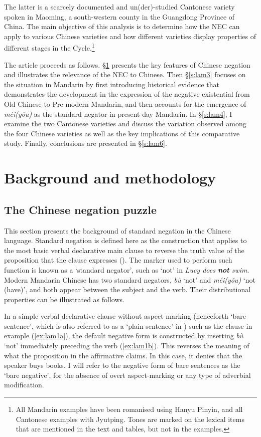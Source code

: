 \documentclass[output=paper]{langscibook}
\begin{document}
The latter is a scarcely documented and un(der)-studied Cantonese variety spoken in Maoming, a south-western county in the Guangdong Province of China. The main objective of this analysis is to determine how the NEC can apply to various Chinese varieties and how different varieties display properties of different stages in the Cycle.\footnote{All Mandarin examples have been romanised using Hanyu Pinyin, and all Cantonese examples with Jyutping. Tones are marked on the lexical items that are mentioned in the text and tables, but not in the examples.} 

The article proceeds as follows. §\ref{s:lam2} presents the key features of Chinese negation and illustrates the relevance of the NEC to Chinese. Then §\ref{s:lam3} focuses on the situation in Mandarin by first introducing historical evidence that demonstrates the development in the expression of the negative existential from Old Chinese to Pre-modern Mandarin, and then accounts for the emergence of \textit{méi(yǒu)} as the standard negator in present-day Mandarin. In §\ref{s:lam4}, I examine the two Cantonese varieties and discuss the variation observed among the four Chinese varieties as well as the key implications of this comparative study. Finally, conclusions are presented in §\ref{s:lam6}. 

\section{Background and methodology}\label{s:lam2}
\subsection{The Chinese negation puzzle}\label{s:lam2-1}

This section presents the background of standard negation in the Chinese language. Standard negation is defined here as the construction that applies to the most basic verbal declarative main clause to reverse the truth value of the proposition that the clause expresses (\citealt{Miestamo2005}). The marker used to perform such function is known as a `standard negator', such as `not' in \textit{Lucy does \textbf{not} swim}. Modern Mandarin Chinese has two standard negators, \textit{bù} `not' and \textit{méi(yǒu)} `not (have)', and both appear between the subject and the verb. Their distributional properties can be illustrated as follows. 

In a simple verbal declarative clause without aspect-marking (henceforth `bare sentence', which is also referred to as a `plain sentence' in \citealt{Wang1965}) such as the clause in example (\ref{ex:lam1a}), the default negative form is constructed by inserting \textit{bù} `not' immediately preceding the verb (\ref{ex:lam1b}). This reverses the meaning of what the proposition in the affirmative claims. In this case, it denies that the speaker buys books. I will refer to the negative form of bare sentences as the `bare negative', for the absence of overt aspect-marking or any type of adverbial modification.
\end{document}
